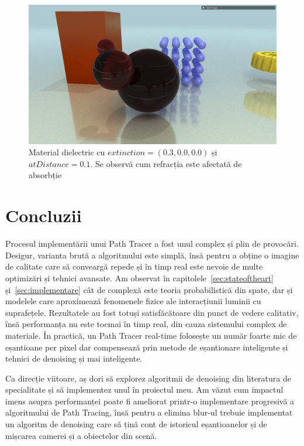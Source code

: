 \documentclass[12pt,a4paper]{report}
\numberwithin{equation}{section} %
\begin{document}
\begin{figure}[!htb]
	\centering
	\includegraphics[width=\textwidth]{pics/demo-extinction-0.3-atdistance-0.1.png}
	\caption{Material dielectric cu $extinction = (0.3, 0.0, 0.0)$ și $atDistance = 0.1$. Se observă cum refracția este afectată de absorbție}
	\label{fig:demo-extinction-0.3-atdistance-0.1}
\end{figure}


\chapter{\label{sec:concluzii}Concluzii}

Procesul implementării unui Path Tracer a fost unul complex și plin de provocări. Desigur,
varianta brută a algoritmului este simplă, însă pentru a obține o imagine de calitate
care să conveargă repede și în timp real este nevoie de multe optimizări și tehnici
avansate. Am observat în capitolele~\ref{sec:stateoftheart} și~\ref{sec:implementare}
cât de complexă este teoria probabilistică din spate, dar și modelele care aproximează
fenomenele fizice ale interacțiunii luminii cu suprafețele. Rezultatele au fost totuși
satisfăcătoare din punct de vedere calitativ, însă performanța nu este tocmai în timp real,
din cauza sistemului complex de materiale. În practică, un Path Tracer real-time folosește
un număr foarte mic de eșantioane per pixel dar compensează prin metode de eșantionare
inteligente și tehnici de denoising și mai inteligente.

Ca direcție viitoare, aș dori să explorez algoritmii de denoising din literatura de
specialitate și să implementez unul în proiectul meu. Am văzut cum impactul imens
asupra performanței poate fi ameliorat printr-o implementare progresivă a algoritmului
de Path Tracing, însă pentru a elimina blur-ul trebuie implementat un algoritm de denoising
care să țină cont de istoricul eșantioanelor și de mișcarea camerei și a obiectelor din scenă.
\end{document}
